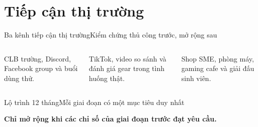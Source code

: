 \section{Tiếp cận thị trường}

\begin{frame}{Ba kênh tiếp cận thị trường}{Kiểm chứng thủ công trước, mở rộng sau}
  \vspace{1em}
  \begin{columns}[T,onlytextwidth]
      \par\vspace{.45em}
      CLB trường, Discord, Facebook group và buổi dùng thử.
      \par\vspace{.45em}
      TikTok, video so sánh và đánh giá gear trong tình huống thật.
      \par\vspace{.45em}
      Shop SME, phòng máy, gaming cafe và giải đấu sinh viên.
  \end{columns}
\end{frame}

\begin{frame}{Lộ trình 12 tháng}{Mỗi giai đoạn có một mục tiêu duy nhất}
  \vspace{1.4em}
  \centering
  \vfill
  \centering\textcolor{mutuxOrange}{\textbf{Chỉ mở rộng khi các chỉ số của giai đoạn trước đạt yêu cầu.}}
\end{frame}

